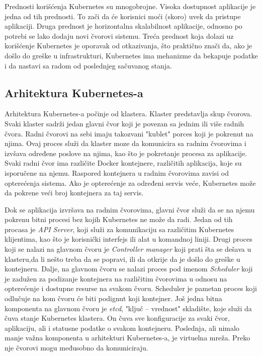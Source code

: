 Prednosti korišćenja Kubernetes su mnogobrojne. Visoka dostupnost aplikacije je jedna od tih prednosti. 
To zači da će korisnici moći (skoro) uvek da pristupe aplikaciji. Druga prednost je horizontalna 
skalabilnost aplikacije, odnosno po potrebi se lako dodaju novi čvorovi sistemu. Treća prednost koja 
dolazi uz korišćenje Kubernetes je oporavak od otkazivanja, što praktično znači da, ako je došlo do 
greške u infrastrukturi, Kubernetes ima mehanizme da bekapuje podatke i da nastavi sa radom od 
poslednjeg sačuvanog stanja.

\subsection{Arhitektura Kubernetes-a}
Arhitektura Kubernetes-a počinje od klastera. Klaster predstavlja skup čvorova. Svaki klaster sadrži
jedan glavni čvor koji je povezan sa jednim ili više radnih čvora. Radni čvorovi na sebi imaju 
takozvani "kublet" porces koji je pokrenut na njima. Ovaj proces služi da klaster moze da komunicira
sa radnim čvorovima i izvšava određene poslove na njima, kao što je pokretanje procesa za aplikacije.
Svaki radni čvor ima različite Docker kontejnere, različitih aplikacija, koje su isporučene na njemu.
Raspored kontejnera u radnim čvorovima zavisi od opterećenja sistema. Ako je opterećenje za određeni 
servis veće, Kubernetes može da pokrene veći broj kontejnera za taj servis. 

Dok se aplikacija izvršava na radnim čvorovima, glavni čvor služi da se na njemu pokrenu bitni procesi 
bez kojih Kubernetes ne može da radi. Jedan od tih procasa je {\em API Server}, koji služi za 
komunikaciju sa različitim Kubernetes klijentima, kao što je korisnički interfejs ili alat u 
komandnoj liniji. Drugi proces koji se nalazi na glavnom čvoru je {\em Controller manager} koji 
prati šta se dešava u klasteru,da li nešto treba da se popravi, ili da otkrije da je došlo do greške 
u kontejneru. Dalje, na glavnom čvoru se nalazi proces pod imenom {\em Scheduler} koji je zadužen 
za podizanje kontejnera na različitim čvorovima u odnosu na opterećenje i dostupne resurse na svakom 
čvoru. Scheduler je pametan proces koji odlučuje na kom čvoru će biti podignut koji kontejner. 
Još jedna bitna komponenta na glavnom čvoru je {\em etcd}, "ključ -- vrednost" skladište, koje služi 
da čuva stanje Kubernetes klastera. On čuva sve konfiguracije za svaki čvor, aplikaciju, ali i statusne 
podatke o svakom kontejneru. Poslednja, ali nimalo manje važna komponenta u arhitekturi Kubernetes-a, 
je virtuelna mreža. Preko nje čvorovi mogu međusobno da komuniciraju. 

